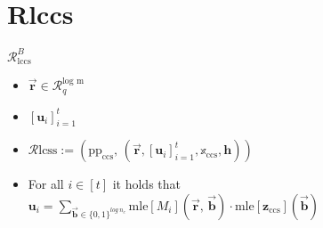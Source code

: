 \section{Rlccs}
\begin{frame}
    {$\mathcal{R}^B_{\text{lccs}}$}
    \begin{itemize}
        \item $\overrightarrow{\textbf{r}} \in \mathcal{R}^{\text{log m}}_{q}$
        \item $[\textbf{u}_i]^{t}_{i=1}$
        \item $\mathcal{R}{\text{lcss}} := (\text{pp}_{\text{ccs}},\, (\overrightarrow{\textbf{r}}, [\textbf{u}_i]^{t}_{i=1}, \mathbb{x}_{\text{ccs}}, \textbf{h}))$
        \item For all $i \in [t]$ it holds that $\textbf{u}_i = \sum_{\overrightarrow{\textbf{b}} \in \{0, 1\}^{log\ n_{c}}} \text{mle}[M_{i}](\overrightarrow{\textbf{r}},\,\overrightarrow{\textbf{b}}) \cdot \text{mle}[\textbf{z}_{\text{ccs}}](\overrightarrow{\textbf{b}})$
    \end{itemize}
\end{frame}
